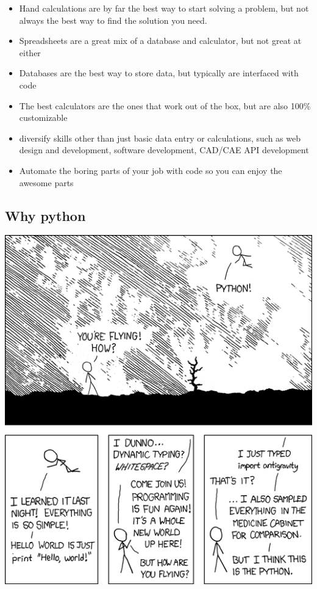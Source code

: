 \documentclass[%
oneside,                 %
final,                   %
10pt]{article}
\begin{document}
\begin{itemize}
 \item Hand calculations are by far the best way to start solving a problem, but not always the best way to find the solution you need.

 \item Spreadsheets are a great mix of a database and calculator, but not great at either

 \item Databases are the best way to store data, but typically are interfaced with code

 \item The best calculators are the ones that work out of the box, but are also 100\% customizable

 \item diversify skills other than just basic data entry or calculations, such as web design and development, software development, CAD/CAE API development

 \item Automate the boring parts of your job with code so you can enjoy the awesome parts
\end{itemize}

\noindent

\subsection{Why python}



\centerline{\includegraphics[width=0.9\linewidth]{fig/xkcd-python.png}}
\end{document}
